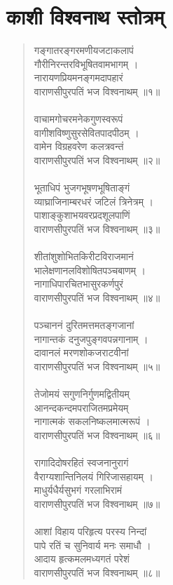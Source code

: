 \section{\sanskrit काशी विश्वनाथ स्तोत्रम्}
\begin{quotation}\chandas
गङ्गातरङ्गरमणीयजटाकलापं\\
गौरीनिरन्तरविभूषितवामभागम् ।\\
नारायणप्रियमनङ्गमदापहारं\\
वाराणसीपुरपतिं भज विश्वनाथम् ॥१॥\\
\\
वाचामगोचरमनेकगुणस्वरूपं\\
वागीशविष्णुसुरसेवितपादपीठम् ।\\
वामेन विग्रहवरेण कलत्रवन्तं\\
वाराणसीपुरपतिं भज विश्वनाथम् ॥२॥\\
\\
भूताधिपं भुजगभूषणभूषिताङ्गं\\
व्याघ्राजिनाम्बरधरं जटिलं त्रिनेत्रम् ।\\
पाशाङ्कुशाभयवरप्रदशूलपाणिं\\
वाराणसीपुरपतिं भज विश्वनाथम् ॥३॥\\
\\
शीतांशुशोभितकिरीटविराजमानं\\
भालेक्षणानलविशोषितपञ्चबाणम् ।\\
नागाधिपारचितभासुरकर्णपुरं\\
वाराणसीपुरपतिं भज विश्वनाथम् ॥४॥\\
\\
पञ्चाननं दुरितमत्तमतङ्गजानां\\
नागान्तकं दनुजपुङ्गवपन्नगानाम् ।\\
दावानलं मरणशोकजराटवीनां\\
वाराणसीपुरपतिं भज विश्वनाथम् ॥५॥\\
\\
तेजोमयं सगुणनिर्गुणमद्वितीयम्\\
आनन्दकन्दमपराजितमप्रमेयम्\\
नागात्मकं सकलनिष्कलमात्मरूपं ।\\
वाराणसीपुरपतिं भज विश्वनाथम् ॥६॥\\
\\
रागादिदोषरहितं स्वजनानुरागं\\
वैराग्यशान्तिनिलयं गिरिजासहायम् ।\\
माधुर्यधैर्यसुभगं गरलाभिरामं\\
वाराणसीपुरपतिं भज विश्वनाथम् ॥७॥\\
\\
आशां विहाय परिहृत्य परस्य निन्दां\\
पापे रतिं च सुनिवार्य मनः समाधौ ।\\
आदाय हृत्कमलमध्यगतं परेशं\\
वाराणसीपुरपतिं भज विश्वनाथम् ॥८॥\\
\end{quotation}


